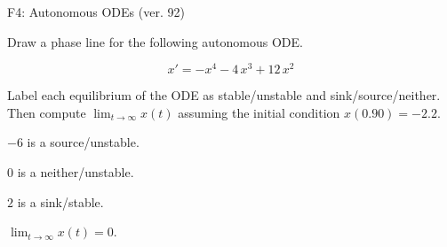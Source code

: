 \begin{exercise}
  \begin{exerciseTitle}F4: Autonomous ODEs (ver. 92)\end{exerciseTitle}
  \begin{exerciseStatement}
    

      Draw a phase line for the following 
      autonomous ODE.
    

    
\[x'= -x^{4} - 4 \, x^{3} + 12 \, x^{2}\]

    

      Label each equilibrium of the ODE
      as stable/unstable and sink/source/neither.
      Then compute \(\lim_{t\to\infty}x(t)\)
      assuming the initial condition
      \(x( 0.90 )= -2.2\).
    

  \end{exerciseStatement}
  \begin{exerciseAnswer}
    

      \(-6\) is a source/unstable.
      
        \(0\) is a neither/unstable.
      
      \(2\) is a sink/stable.
    

    

      \(\lim_{t\to\infty}x(t)=0\).
    

  \end{exerciseAnswer}
\end{exercise}